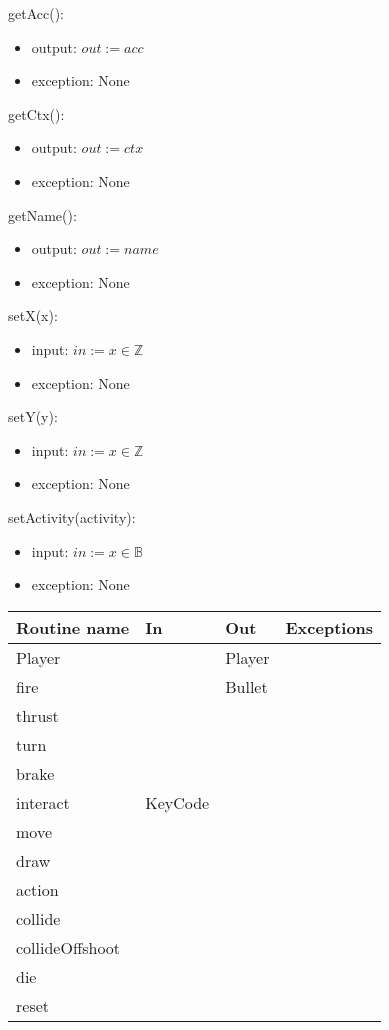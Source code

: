 \documentclass[12pt]{article}
\begin{document}
getAcc():
\begin{itemize}
    \item output: $out := acc$
    \item exception: None
\end{itemize}

getCtx():
\begin{itemize}
    \item output: $out := ctx$
    \item exception: None
\end{itemize}

getName():
\begin{itemize}
    \item output: $out := name$
    \item exception: None
\end{itemize}

setX(x):
\begin{itemize}
    \item input: $in := x \in \mathbb{Z}$
    \item exception: None
\end{itemize}

setY(y):
\begin{itemize}
    \item input: $in := x \in \mathbb{Z}$
    \item exception: None
\end{itemize}

setActivity(activity):
\begin{itemize}
    \item input: $in := x \in \mathbb{B}$
    \item exception: None
\end{itemize}

\newpage

\begin{tabular}{| l | l | l | l |}
    \hline
    \textbf{Routine name} & \textbf{In} & \textbf{Out} & \textbf{Exceptions}\\
    \hline
    Player & ~ & Player & ~\\
    \hline
    fire & ~ & Bullet & ~\\
    \hline
    thrust & ~ & ~ & ~\\
    \hline
    turn & ~ & ~ & ~\\
    \hline
    brake & ~ & ~ & ~\\
    \hline
    interact & KeyCode & ~ & ~\\
    \hline
    move & ~ & ~ & ~\\
    \hline
    draw & ~ & ~ & ~\\
    \hline
    action & ~ & ~ & ~\\
    \hline
    collide & ~ & ~ & ~\\
    \hline
    collideOffshoot & ~ & ~ & ~\\
    \hline
    die & ~ & ~ & ~\\
    \hline
    reset & ~ & ~ & ~\\
    \hline
\end{tabular}
\end{document}
